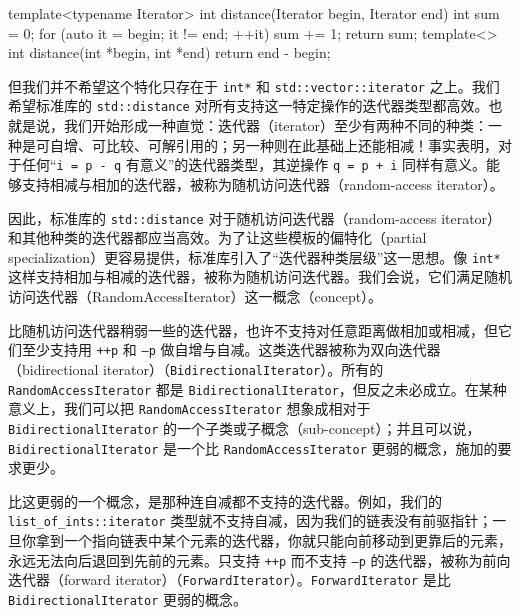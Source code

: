 \begin{codebox}[cpp]
    template<typename Iterator>
    int distance(Iterator begin, Iterator end)
    {
      int sum = 0;
      for (auto it = begin; it != end; ++it) {
        sum += 1;
      }
      return sum;
    }
    template<>
    int distance(int *begin, int *end)
    {
      return end - begin;
    }
\end{codebox}

但我们并不希望这个特化只存在于 \texttt{int*} 和 \texttt{std::\allowbreak{}vector::\allowbreak{}iterator} 之上。我们希望标准库的 \texttt{std::\allowbreak{}distance} 对所有支持这一特定操作的迭代器类型都高效。也就是说，我们开始形成一种直觉：迭代器（iterator）至少有两种不同的种类：一种是可自增、可比较、可解引用的；另一种则在此基础上还能相减！事实表明，对于任何“\texttt{i = p - q} 有意义”的迭代器类型，其逆操作 \texttt{q = p + i} 同样有意义。能够支持相减与相加的迭代器，被称为随机访问迭代器（random-access iterator）。

因此，标准库的 \texttt{std::\allowbreak{}distance} 对于随机访问迭代器（random-access iterator）和其他种类的迭代器都应当高效。为了让这些模板的偏特化（partial specialization）更容易提供，标准库引入了“迭代器种类层级”这一思想。像 \texttt{int*} 这样支持相加与相减的迭代器，被称为随机访问迭代器。我们会说，它们满足随机访问迭代器（RandomAccessIterator）这一概念（concept）。

比随机访问迭代器稍弱一些的迭代器，也许不支持对任意距离做相加或相减，但它们至少支持用 \texttt{++p} 和 \texttt{--p} 做自增与自减。这类迭代器被称为双向迭代器（bidirectional iterator）（\texttt{Bidirectional\allowbreak{}Iterator}）。所有的 \texttt{Random\allowbreak{}Access\allowbreak{}Iterator} 都是 \texttt{Bidirectional\allowbreak{}Iterator}，但反之未必成立。在某种意义上，我们可以把 \texttt{Random\allowbreak{}Access\allowbreak{}Iterator} 想象成相对于 \texttt{Bidirectional\allowbreak{}Iterator} 的一个子类或子概念（sub-concept）；并且可以说，\texttt{Bidirectional\allowbreak{}Iterator} 是一个比 \texttt{Random\allowbreak{}Access\allowbreak{}Iterator} 更弱的概念，施加的要求更少。

比这更弱的一个概念，是那种连自减都不支持的迭代器。例如，我们的 \texttt{list\_\allowbreak{}of\_\allowbreak{}ints::\allowbreak{}iterator} 类型就不支持自减，因为我们的链表没有前驱指针；一旦你拿到一个指向链表中某个元素的迭代器，你就只能向前移动到更靠后的元素，永远无法向后退回到先前的元素。只支持 \texttt{++p} 而不支持 \texttt{--p} 的迭代器，被称为前向迭代器（forward iterator）（\texttt{Forward\allowbreak{}Iterator}）。\texttt{Forward\allowbreak{}Iterator} 是比 \texttt{Bidirectional\allowbreak{}Iterator} 更弱的概念。

